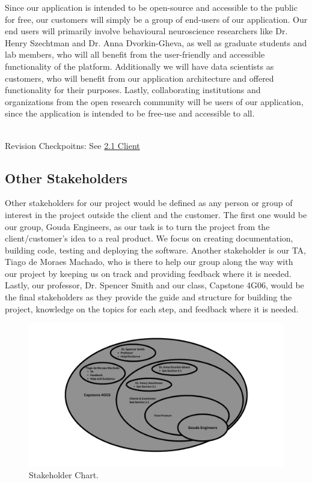 \documentclass[12pt]{article}
\begin{document}
\par{Since our application is intended to be \gls{open-source} and accessible to the public for free, our customers will simply be a group of end-users
of our application. Our end users will primarily involve behavioural neuroscience researchers like Dr. Henry Szechtman and Dr. Anna Dvorkin-Gheva, 
as well as graduate students and lab members, who will all benefit from the user-friendly and accessible functionality of the platform. 
Additionally we will have data scientists as customers, who will benefit from our application architecture and offered functionality for 
their purposes. Lastly, collaborating institutions and organizations from the open research community will be users of our application, 
since the application is intended to be free-use and accessible to all.\\\\}
\par{Revision Checkpoitns: See \hyperref[sec:2.1client]{2.1 Client}}


\subsection{Other Stakeholders}

\par{Other stakeholders for our project would be defined as any person or group of interest in the project outside the 
client and the customer. The first one would be our group, Gouda Engineers, as our task is to turn the project from the 
client/customer’s idea to a real product. We focus on creating documentation, building code, testing and deploying the 
software. Another stakeholder is our TA, Tiago de Moraes Machado, who is there to help our group along the way with our 
project by keeping us on track and providing feedback where it is needed. Lastly, our professor, Dr. Spencer Smith and our 
class, Capstone 4G06, would be the final stakeholders as they provide the guide and structure for building the project, 
knowledge on the topics for each step, and feedback where it is needed.}

\begin{figure}[H]
    \centering
    \includegraphics[width=1\textwidth]{2.3 Other Stakeholders Chart.png}
    \caption{Stakeholder Chart.}
    \label{fig:myimage}
\end{figure}
\end{document}
